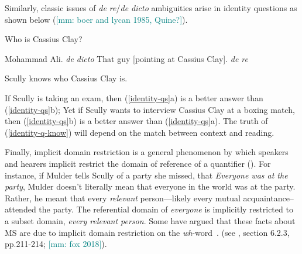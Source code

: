 \documentclass[12pt,letterpaper,table,svgnames,dvipsnames]{article}
\newcommand{\mm}[1]{\textcolor{teal}{[mm: #1]}}
\newcommand{\whqs}{\emph{wh}-questions~}
\newcommand{\whw}{\emph{wh}-word~}
\begin{document}
Similarly, classic issues of \emph{de re}/\emph{de dicto} ambiguities arise in identity questions as shown below (\cite{boerlycan75}\mm{boer and lycan 1985, Quine?}\cite{heim1994,groenstok1984}). 
\begin{exe}
\ex Who is Cassius Clay? \label{identity-qs}
    \begin{xlist}
        \ex Mohammad Ali. \hfill \emph{de dicto}
        \ex That guy [pointing at Cassius Clay]. \hfill \emph{de re}
    \end{xlist}
    \ex Scully knows who Cassius Clay is. \label{identity-q-know}
\end{exe}
If Scully is taking an exam, then (\ref{identity-qs}a) is a better answer than (\ref{identity-qs}b); Yet if Scully wants to interview Cassius Clay at a boxing match, then (\ref{identity-qs}b) is a better answer than (\ref{identity-qs}a). The truth of (\ref{identity-q-know}) will depend on the match between context and reading.




Finally, implicit domain restriction is a general phenomenon by which speakers and hearers implicit restrict the domain of reference of a quantifier (\cite{vonfintel1994}). For instance, if Mulder tells Scully of a party she missed, that \emph{Everyone was at the party}, Mulder doesn't literally mean that everyone in the world was at the party. Rather, he meant that every \emph{relevant} person---likely every mutual acquaintance--attended the party. The referential domain of \emph{everyone} is implicitly restricted to a subset domain, \emph{every relevant person}. Some have argued that these facts about MS are due to implicit domain restriction on the \whw$\!$. (see \cite{george2011}, section 6.2.3, pp.211-214; \mm{fox 2018}).
\end{document}
